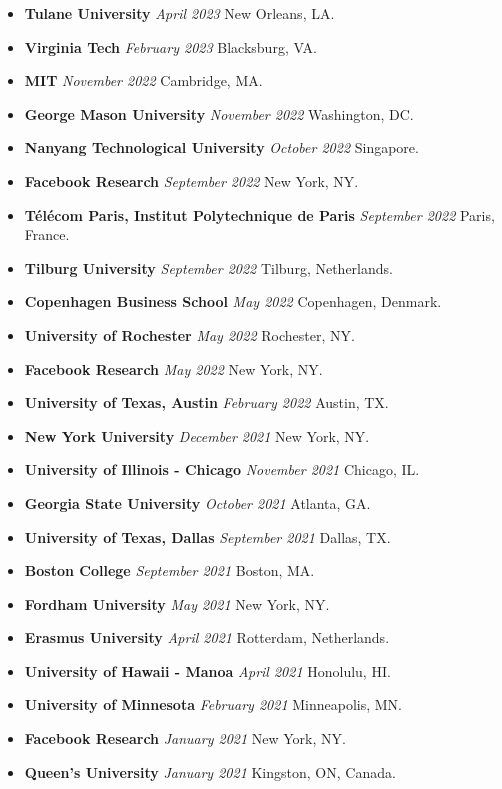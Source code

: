 \documentclass[10.5pt,letterpaper,sans]{moderncv}        %
\begin{document}
\begin{itemize}
\item \textbf{Tulane University} \textit{April 2023} New Orleans, LA.
\item \textbf{Virginia Tech} \textit{February 2023} Blacksburg, VA.
\item \textbf{MIT} \textit{November 2022} Cambridge, MA.
\item \textbf{George Mason University} \textit{November 2022} Washington, DC.
\item \textbf{Nanyang Technological University} \textit{October 2022} Singapore.
\item \textbf{Facebook Research} \textit{September 2022} New York, NY.
\item \textbf{T\'el\'ecom Paris, Institut Polytechnique de Paris} \textit{September 2022} Paris, France.
\item \textbf{Tilburg University} \textit{September 2022} Tilburg, Netherlands.
\item \textbf{Copenhagen Business School} \textit{May 2022} Copenhagen, Denmark.
\item \textbf{University of Rochester} \textit{May 2022} Rochester, NY.
\item \textbf{Facebook Research} \textit{May 2022} New York, NY.
\item \textbf{University of Texas, Austin} \textit{February 2022} Austin, TX.
\item \textbf{New York University} \textit{December 2021} New York, NY.
\item \textbf{University of Illinois - Chicago} \textit{November 2021} Chicago, IL.
\item \textbf{Georgia State University} \textit{October 2021} Atlanta, GA.
\item \textbf{University of Texas, Dallas} \textit{September 2021} Dallas, TX.
\item \textbf{Boston College} \textit{September 2021} Boston, MA.
\item \textbf{Fordham University} \textit{May 2021} New York, NY.
\item \textbf{Erasmus University} \textit{April 2021} Rotterdam, Netherlands.
\item \textbf{University of Hawaii - Manoa} \textit{April 2021} Honolulu, HI.
\item \textbf{University of Minnesota} \textit{February 2021} Minneapolis, MN.
\item \textbf{Facebook Research} \textit{January 2021} New York, NY.
\item \textbf{Queen's University} \textit{January 2021} Kingston, ON, Canada.

\end{itemize}
\end{document}
